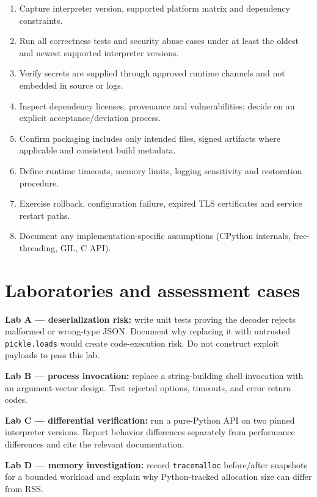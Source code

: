 \documentclass[
  11pt,
]{report}
\newcommand{\passthrough}[1]{#1}
\providecommand{\tightlist}{%
  \setlength{\itemsep}{0pt}\setlength{\parskip}{0pt}}
\begin{document}
\begin{enumerate}
\def\labelenumi{\arabic{enumi}.}
\tightlist
\item
  Capture interpreter version, supported platform matrix and dependency
  constraints.
\item
  Run all correctness tests and security abuse cases under at least the
  oldest and newest supported interpreter versions.
\item
  Verify secrets are supplied through approved runtime channels and not
  embedded in source or logs.
\item
  Inspect dependency licenses, provenance and vulnerabilities; decide on
  an explicit acceptance/deviation process.
\item
  Confirm packaging includes only intended files, signed artifacts where
  applicable and consistent build metadata.
\item
  Define runtime timeouts, memory limits, logging sensitivity and
  restoration procedure.
\item
  Exercise rollback, configuration failure, expired TLS certificates and
  service restart paths.
\item
  Document any implementation-specific assumptions (CPython internals,
  free-threading, GIL, C API).
\end{enumerate}

\chapter{Laboratories and assessment
cases}\label{laboratories-and-assessment-cases}

\textbf{Lab A --- deserialization risk:} write unit tests proving the
decoder rejects malformed or wrong-type JSON. Document why replacing it
with untrusted \passthrough{\lstinline!pickle.loads!} would create
code-execution risk. Do not construct exploit payloads to pass this lab.

\textbf{Lab B --- process invocation:} replace a string-building shell
invocation with an argument-vector design. Test rejected options,
timeouts, and error return codes.

\textbf{Lab C --- differential verification:} run a pure-Python API on
two pinned interpreter versions. Report behavior differences separately
from performance differences and cite the relevant documentation.

\textbf{Lab D --- memory investigation:} record
\passthrough{\lstinline!tracemalloc!} before/after snapshots for a
bounded workload and explain why Python-tracked allocation size can
differ from RSS.
\end{document}
